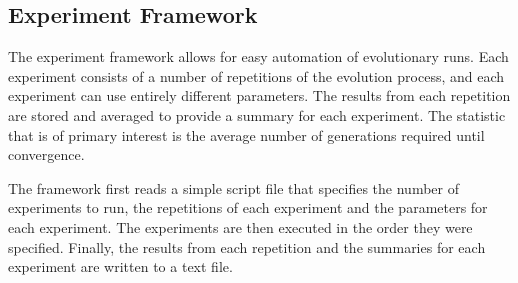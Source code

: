 \documentclass[12pt]{article} %
\begin{document}
\subsection{Experiment Framework}

The experiment framework allows for easy automation of evolutionary runs. Each experiment consists of a number of repetitions of the evolution process, and each experiment can use entirely different parameters. The results from each repetition are stored and averaged to provide a summary for each experiment. The statistic that is of primary interest is the average number of generations required until convergence.

The framework first reads a simple script file that specifies the number of experiments to run, the repetitions of each experiment and the parameters for each experiment. The experiments are then executed in the order they were specified. Finally, the results from each repetition and the summaries for each experiment are written to a text file.

{}

\end{document}
